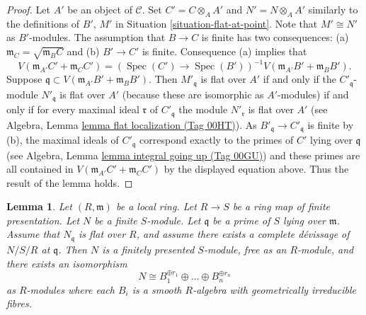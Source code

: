 \documentclass{amsart}
\theoremstyle{plain}
\newtheorem{lemma}[subsection]{Lemma}
\theoremstyle{definition}
\theoremstyle{remark}
\numberwithin{equation}{subsection}
\def\Spec{\mathop{\mathrm{Spec}}}
\begin{document}
\begin{proof}
Let $A'$ be an object of $\mathcal{C}$. Set $C' = C \otimes_A A'$
and $N' = N \otimes_A A'$ similarly to the definitions of $B'$, $M'$ in
Situation \ref{situation-flat-at-point}.
Note that $M' \cong N'$ as $B'$-modules.
The assumption that $B \to C$ is finite has two consequences:
(a) $\mathfrak m_C = \sqrt{\mathfrak m_B C}$ and (b)
$B' \to C'$ is finite. Consequence (a) implies that
$$
V(\mathfrak m_{A'}C' + \mathfrak m_C C')
=
\left(
\Spec(C') \to \Spec(B')
\right)^{-1}V(\mathfrak m_{A'}B' + \mathfrak m_B B').
$$
Suppose $\mathfrak q \subset V(\mathfrak m_{A'}B' + \mathfrak m_B B')$.
Then $M'_{\mathfrak q}$ is flat over $A'$ if and only if
the $C'_{\mathfrak q}$-module $N'_{\mathfrak q}$ is flat over $A'$
(because these are isomorphic as $A'$-modules) if and only if
for every maximal ideal $\mathfrak r$ of $C'_{\mathfrak q}$
the module $N'_{\mathfrak r}$ is flat over $A'$ (see
Algebra, Lemma \href{https://stacks.math.columbia.edu/tag/00HT}{lemma flat localization (Tag 00HT)}).
As $B'_{\mathfrak q} \to C'_{\mathfrak q}$ is finite by (b),
the maximal ideals of $C'_{\mathfrak q}$ correspond exactly
to the primes of $C'$ lying over $\mathfrak q$ (see
Algebra, Lemma \href{https://stacks.math.columbia.edu/tag/00GU}{lemma integral going up (Tag 00GU)})
and these primes are all contained in
$V(\mathfrak m_{A'}C' + \mathfrak m_C C')$ by
the displayed equation above. Thus the result of the lemma holds.
\end{proof}


\begin{lemma}
\label{lemma-complete-devissage-flat-finite-type-module}
Let $(R, \mathfrak m)$ be a local ring.
Let $R \to S$ be a ring map of finite presentation.
Let $N$ be a finite $S$-module.
Let $\mathfrak q$ be a prime of $S$ lying over $\mathfrak m$.
Assume that $N_{\mathfrak q}$ is flat over $R$, and
assume there exists a complete d\'evissage of $N/S/R$ at $\mathfrak q$.
Then $N$ is a finitely presented $S$-module, free as an $R$-module,
and there exists an isomorphism
$$
N \cong B_1^{\oplus r_1} \oplus \ldots \oplus B_n^{\oplus r_n}
$$
as $R$-modules where each $B_i$ is a smooth $R$-algebra with geometrically
irreducible fibres.
\end{lemma}
\end{document}
